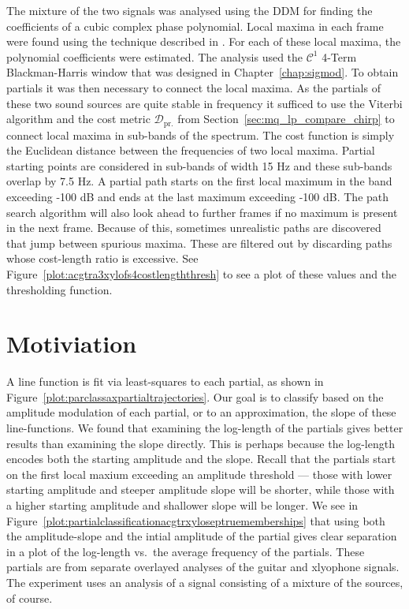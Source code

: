 The mixture of the two signals was analysed using the DDM for finding the
coefficients of a cubic complex phase polynomial. Local maxima in each frame
were found using the technique described in \cite[p.~42]{serra1989system}. For
each of these local maxima, the polynomial coefficients were estimated. The
analysis used the $\mathcal{C}^{1}$ 4-Term Blackman-Harris window that was
designed in Chapter~\ref{chap:sigmod}. To obtain
partials it was then necessary to connect the local maxima. As the partials of
these two sound sources are quite stable in frequency it sufficed to use the
Viterbi algorithm \cite{forney1973viterbi} and the cost metric
$\mathcal{D}_{\text{pr.}}$ from Section~\ref{sec:mq_lp_compare_chirp} to connect
local maxima in sub-bands of the spectrum. The cost function is simply the
Euclidean distance between the frequencies of two local maxima. Partial starting
points are considered in sub-bands of width 15 Hz and these sub-bands overlap by
7.5 Hz. A partial path starts on the first local maximum in the band exceeding
-100 dB and ends at the last maximum exceeding -100 dB. The path search
algorithm will also look ahead to further frames if no maximum is present in the
next frame. Because of this, sometimes unrealistic paths are discovered that
jump between spurious maxima. These are filtered out by discarding paths whose
cost-length ratio is excessive. See
Figure~\ref{plot:acgtra3xylofs4costlengththresh} to see a plot of these values
and the thresholding function. 

\section{Motiviation}

A line function is fit via least-squares to each partial, as shown in
Figure~\ref{plot:parclassaxpartialtrajectories}. Our goal is to classify based
on the amplitude modulation of each partial, or to an approximation, the slope of these line-functions. We found that examining the log-length of the
partials gives better results than examining the slope directly. This is perhaps
because the log-length encodes both the starting amplitude and the slope. Recall
that the partials start on the first local maxium exceeding an amplitude
threshold --- those with lower starting amplitude and steeper amplitude slope will be
shorter, while those with a higher starting amplitude and shallower slope will
be longer. We see in
Figure~\ref{plot:partialclassificationacgtrxyloseptruememberships} that using
both the amplitude-slope and the intial amplitude of the partial gives clear
separation in a plot of the log-length vs.\ the
average frequency of
the partials. These partials are from separate overlayed analyses of the guitar
and xlyophone signals. The experiment uses an analysis of a signal consisting of
a mixture of the sources, of course.

